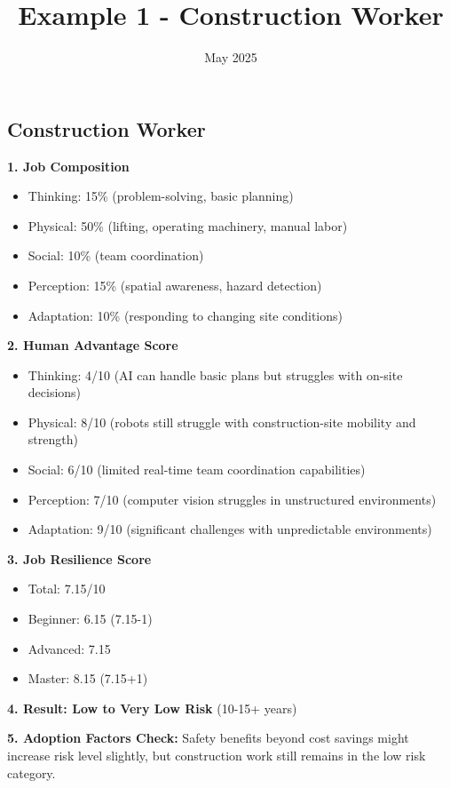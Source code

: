 \documentclass[
  11pt,
]{article}
\title{Example 1 - Construction Worker}
\author{}
\date{May 2025}
\providecommand{\tightlist}{%
  \setlength{\itemsep}{0pt}\setlength{\parskip}{0pt}}
\begin{document}
\maketitle

\subsection{Construction Worker}\label{construction-worker}

\textbf{1. Job Composition}

\begin{itemize}
\tightlist
\item
  Thinking: 15\% (problem-solving, basic planning)
\item
  Physical: 50\% (lifting, operating machinery, manual labor)
\item
  Social: 10\% (team coordination)
\item
  Perception: 15\% (spatial awareness, hazard detection)
\item
  Adaptation: 10\% (responding to changing site conditions)
\end{itemize}

\textbf{2. Human Advantage Score}

\begin{itemize}
\tightlist
\item
  Thinking: 4/10 (AI can handle basic plans but struggles with on-site
  decisions)
\item
  Physical: 8/10 (robots still struggle with construction-site mobility
  and strength)
\item
  Social: 6/10 (limited real-time team coordination capabilities)
\item
  Perception: 7/10 (computer vision struggles in unstructured
  environments)
\item
  Adaptation: 9/10 (significant challenges with unpredictable
  environments)
\end{itemize}

\textbf{3. Job Resilience Score}

\begin{itemize}
\tightlist
\item
  Total: 7.15/10
\item
  Beginner: 6.15 (7.15-1)
\item
  Advanced: 7.15
\item
  Master: 8.15 (7.15+1)
\end{itemize}

\textbf{4. Result: Low to Very Low Risk} (10-15+ years)

\textbf{5. Adoption Factors Check:} Safety benefits beyond cost savings
might increase risk level slightly, but construction work still remains
in the low risk category.
\end{document}
